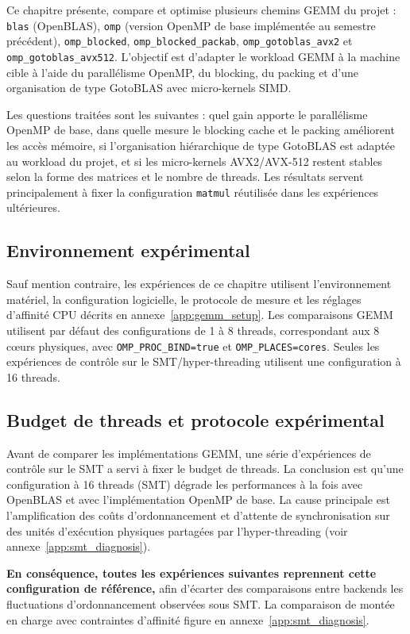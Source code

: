 \documentclass[a4paper,11pt,oneside]{article}
\begin{document}
Ce chapitre présente, compare et optimise plusieurs chemins GEMM du projet : \texttt{blas} (OpenBLAS), \texttt{omp} (version OpenMP de base implémentée au semestre précédent), \texttt{omp\_blocked}, \texttt{omp\_blocked\_packab}, \texttt{omp\_gotoblas\_avx2} et \texttt{omp\_gotoblas\_avx512}. L'objectif est d'adapter le workload GEMM à la machine cible à l'aide du parallélisme OpenMP, du blocking, du packing et d'une organisation de type GotoBLAS avec micro-kernels SIMD.

Les questions traitées sont les suivantes : quel gain apporte le parallélisme OpenMP de base, dans quelle mesure le blocking cache et le packing améliorent les accès mémoire, si l'organisation hiérarchique de type GotoBLAS est adaptée au workload du projet, et si les micro-kernels AVX2/AVX-512 restent stables selon la forme des matrices et le nombre de threads. Les résultats servent principalement à fixer la configuration \texttt{matmul} réutilisée dans les expériences ultérieures.

\subsection{Environnement expérimental}
Sauf mention contraire, les expériences de ce chapitre utilisent l'environnement matériel, la configuration logicielle, le protocole de mesure et les réglages d'affinité CPU décrits en annexe~\ref{app:gemm_setup}. Les comparaisons GEMM utilisent par défaut des configurations de 1 à 8 threads, correspondant aux 8 c\oe urs physiques, avec \texttt{OMP\_PROC\_BIND=true} et \texttt{OMP\_PLACES=cores}. Seules les expériences de contrôle sur le SMT/hyper-threading utilisent une configuration à 16 threads.

\subsection{Budget de threads et protocole expérimental}\label{sec:gemm_smt}

Avant de comparer les implémentations GEMM, une série d'expériences de contrôle sur le SMT a servi à fixer le budget de threads. La conclusion est qu'une configuration à 16 threads (SMT) dégrade les performances à la fois avec OpenBLAS et avec l'implémentation OpenMP de base. La cause principale est l'amplification des coûts d'ordonnancement et d'attente de synchronisation sur des unités d'exécution physiques partagées par l'hyper-threading (voir annexe~\ref{app:smt_diagnosis}).

\textbf{En conséquence, toutes les expériences suivantes reprennent cette configuration de référence,} afin d'écarter des comparaisons entre backends les fluctuations d'ordonnancement observées sous SMT. La comparaison de montée en charge avec contraintes d'affinité figure en annexe~\ref{app:smt_diagnosis}.
\end{document}

